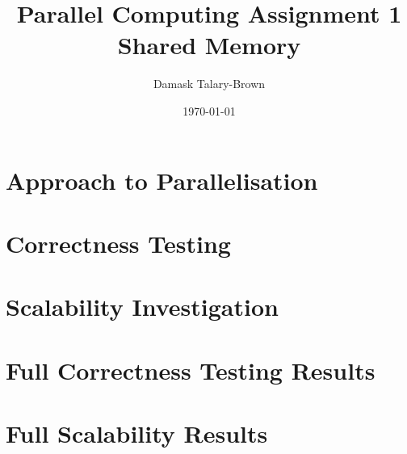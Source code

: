 \documentclass[12pt]{article}
\title{\textbf{Parallel Computing Assignment 1 \\ Shared Memory}}
\author{Damask Talary-Brown}
\date{\today}
\begin{document}
\maketitle

\tableofcontents
\listoffigures
\listoftables

\clearpage
\section{Approach to Parallelisation}

\clearpage
\section{Correctness Testing}

\clearpage
\section{Scalability Investigation}


\clearpage



\begin{appendices}

\clearpage
\section{Full Correctness Testing Results}

\clearpage
\section{Full Scalability Results}
	
\end{appendices}
\end{document}
